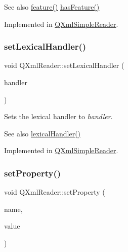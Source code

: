 \begin{DoxySeeAlso}{See also}
\mbox{\hyperlink{class_q_xml_reader_ab4d90af8a5440668582f53e47e9a81d6}{feature()}} \mbox{\hyperlink{class_q_xml_reader_ac9835c64b96d42b60f0bec5962153582}{has\+Feature()}} 
\end{DoxySeeAlso}


Implemented in \mbox{\hyperlink{class_q_xml_simple_reader_a7e435e46bfe139249be78d89a89ff629}{Q\+Xml\+Simple\+Reader}}.

\mbox{\label{class_q_xml_reader_ab38c3816bacd14e3efcb8a5e0e5630be}} 
\subsubsection{\texorpdfstring{setLexicalHandler()}{setLexicalHandler()}}
{\footnotesize\ttfamily void Q\+Xml\+Reader\+::set\+Lexical\+Handler (\begin{DoxyParamCaption}\item[{\mbox{\hyperlink{class_q_xml_lexical_handler}{Q\+Xml\+Lexical\+Handler}} $\ast$}]{handler }\end{DoxyParamCaption})\hspace{0.3cm}{\ttfamily [pure virtual]}}

Sets the lexical handler to {\itshape handler}.

\begin{DoxySeeAlso}{See also}
\mbox{\hyperlink{class_q_xml_reader_ade3f9c1c3b56110187deab81cd837cd5}{lexical\+Handler()}} 
\end{DoxySeeAlso}


Implemented in \mbox{\hyperlink{class_q_xml_simple_reader_ad8788962913e2eaeaf18a8124fb1b770}{Q\+Xml\+Simple\+Reader}}.

\mbox{\label{class_q_xml_reader_aa02ae81ff9636b9961bc333a68ecffa4}} 
\subsubsection{\texorpdfstring{setProperty()}{setProperty()}}
{\footnotesize\ttfamily void Q\+Xml\+Reader\+::set\+Property (\begin{DoxyParamCaption}\item[{const \mbox{\hyperlink{class_q_string}{Q\+String}} \&}]{name,  }\item[{void $\ast$}]{value }\end{DoxyParamCaption})\hspace{0.3cm}{\ttfamily [pure virtual]}}

